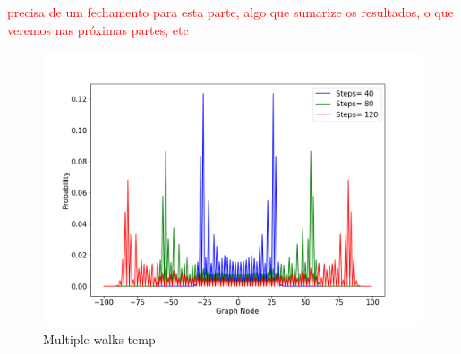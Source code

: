 

                \textcolor{red}{precisa de um fechamento para esta parte, algo que sumarize os resultados, o que veremos nas próximas partes, etc}
                
                \begin{figure}[!h]
                    \centering
                    \includegraphics[scale=0.40]{img/CoinedQuantumWalk/CoinedMultiplepsi001.png}
                    \caption{Multiple walks temp} 
                    \label{fig:coinedwalk3}
                \end{figure}
                

